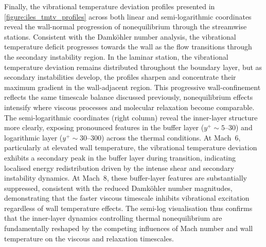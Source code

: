 
Finally, the vibrational temperature deviation profiles presented in \ref{figure:iles_tmtv_profiles} across both linear and semi-logarithmic coordinates reveal the wall-normal progression of nonequilibrium through the streamwise stations. Consistent with the Damköhler number analysis, the vibrational temperature deficit progresses towards the wall as the flow transitions through the secondary instability region. In the laminar station, the vibrational temperature deviation remains distributed throughout the boundary layer, but as secondary instabilities develop, the profiles sharpen and concentrate their maximum gradient in the wall-adjacent region. This progressive wall-confinement reflects the same timescale balance discussed previously, nonequilibrium effects intensify where viscous processes and molecular relaxation become comparable. The semi-logarithmic coordinates (right column) reveal the inner-layer structure more clearly, exposing pronounced features in the buffer layer ($y^+ \sim 5$--$30$) and logarithmic layer ($y^+ \sim 30$--$300$) across the thermal conditions. At Mach~6, particularly at elevated wall temperature, the vibrational temperature deviation exhibits a secondary peak in the buffer layer during transition, indicating localised energy redistribution driven by the intense shear and secondary instability dynamics. At Mach~8, these buffer-layer features are substantially suppressed, consistent with the reduced Damköhler number magnitudes, demonstrating that the faster viscous timescale inhibits vibrational excitation regardless of wall temperature effects. The semi-log visualisation thus confirms that the inner-layer dynamics controlling thermal nonequilibrium are fundamentally reshaped by the competing influences of Mach number and wall temperature on the viscous and relaxation timescales.

